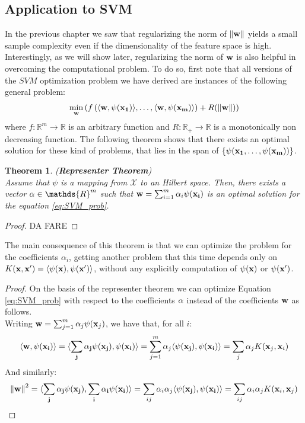 \documentclass[12pt]{report}
\theoremstyle{plain}
\newtheorem{theorem}{Theorem}[chapter]
\newcommand\mcl[1]{\mathcal{#1}}
\newcommand\sprod[2]{\langle \vb{#1},\vb{#2}\rangle}
\begin{document}
\begin{flushleft}
\subsection{Application to SVM}
In the previous chapter we saw that regularizing the norm of $\norm{\vb{w}}$ yields a small
sample complexity even if the dimensionality of the feature space is high. Interestingly, as we will show later, regularizing the norm of $\vb{w}$ is also helpful in overcoming the computational problem. To do so, first note that all versions of the $SVM$ optimization problem we have derived are instances of the following general problem:
\begin{equation} \min_{\vb{w}}\left(f\left(\sprod{w}{\psi(x_1)},\dots,\sprod{w}{\psi(x_m)}\right)+R(\norm{\vb{w}})\right)
\label{eq:SVM_prob}
\end{equation}
where $f:\mathds{R}^m\to\mathds{R}$ is an arbitrary function and $R:\mathds{R}_+\to\mathds{R}$ is a monotonically non decreasing function. The following theorem shows that there exists an optimal solution for these kind of problems, that lies in the span of $\left\{\psi(\vb{x_1},\dots,\psi(\vb{x_m}))\right\}$.
\begin{theorem} (\textbf{Representer Theorem})\\
	Assume that $\psi$ is a mapping from $\mcl{X}$ to an Hilbert space. Then, there exists a vector $\vb{\alpha}\in\mathds{R}^m$ such that $\vb{w}=\sum_{i=1}^m\alpha_i\psi(\vb{x_i})$ is an optimal solution for the equation \ref{eq:SVM_prob}.
\end{theorem}
\begin{proof}
	DA FARE
\end{proof}
The main consequence of this theorem is that we can optimize the problem for the coefficients $\alpha_i$, getting another problem that this time depends only on $K(\vb{x},\vb{x'})=\sprod{\psi(x)}{\psi(x')}$, without any explicitly computation of $\psi(\vb{x})$ or $\psi(\vb{x}')$.\\
\begin{proof}
	On the basis of the representer theorem we can optimize Equation \ref{eq:SVM_prob} with respect to the coefficients $\vb{\alpha}$ instead of the coefficients $\vb{w}$ as follows.\\
	Writing $\vb{w}=\sum_{j=1}^m\alpha_j\psi(\vb{x}_j)$, we have that, for all $i$:
	\[ \sprod{w}{\psi(x_i)}=\sprod{\sum_j\alpha_j\psi(\vb{x_j})}{\psi(x_i)} = \sum_{j=1}^m\alpha_j\sprod{\psi(\vb{x}_j)}{\psi(\vb{x}_i)} = \sum_j\alpha_j K(\vb{x}_j,\vb{x}_i) \]	
	And similarly:
	\[ \norm{\vb{w}}^2=\sprod{\sum_j\alpha_j\psi(\vb{x}_j)}{\sum_i\alpha_i\psi(\vb{x}_i)} =\sum_{ij}\alpha_i\alpha_j\sprod{\psi(\vb{x}_j)}{\psi(\vb{x}_i)} = \sum_{ij}\alpha_i\alpha_jK(\vb{x}_i,\vb{x}_j) \]	
\end{proof}






















\end{flushleft}
\end{document}
